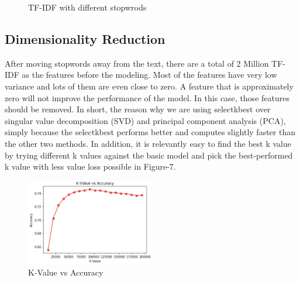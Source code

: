 \documentclass[journal,12pt,onecolumn]{IEEEtran}
\begin{document}
\begin{figure}[h]
    \centering
    \qquad
    \caption{TF-IDF with different stopwrods}
    \label{fig:example}
\end{figure}

\subsection{Dimensionality Reduction}
After moving stopwords away from the text, there are a total of 2 Million TF-IDF as the features before the modeling. Most of the features have very low variance and lots of them are even close to zero. A feature that is approximately zero will not improve the performance of the model. In this case, those features should be removed. In short, the reason why we are using selectkbest over singular value decomposition (SVD) and principal component analysis (PCA), simply because the selectkbest performs better and computes slightly faster than the other two methods. In addition, it is relevantly easy to find the best k value by trying different k values against the basic model and pick the best-performed k value with less value loss possible in Figure-7.

\begin{figure}[h]
    \centering
    \includegraphics[width=0.50\textwidth]{k_feature.jpg}
    \caption{K-Value vs Accuracy}
    \label{fig:Best K Feature}
\end{figure}
\end{document}
